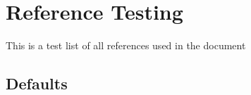 \documentclass[../main.tex]{subfiles}%
\begin{document}
%
\chapter{Reference Testing}%
This is a test list of all references used in the document%
\par%
\section{Defaults}
\cite{latex,UPDATE}
\end{document}
